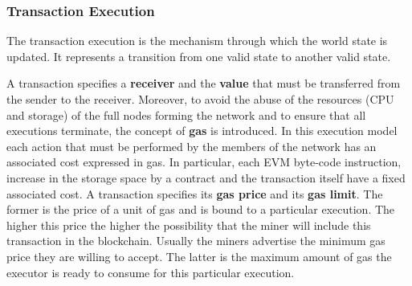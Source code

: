 \subsubsection{Transaction Execution}
\label{sec:tx-execution}

The transaction execution is the mechanism through which the world state is
updated. It represents a transition from one valid state to another valid state.

A transaction specifies a \textbf{receiver} and the \textbf{value} that must be
transferred from the sender to the receiver. Moreover, to avoid the abuse of the
resources (CPU and storage) of the full nodes forming the network and to ensure
that all executions terminate, the concept of \textbf{gas} is introduced. In
this execution model each action that must be performed by the members of the
network has an associated cost expressed in gas. In particular, each EVM
byte-code instruction, increase in the storage space by a contract and the
transaction itself have a fixed associated cost. A transaction specifies its
\textbf{gas price} and its \textbf{gas limit}. The former is the price of a unit
of gas and is bound to a particular execution. The higher this price the higher
the possibility that the miner will include this transaction in the blockchain.
Usually the miners advertise the minimum gas price they are willing to accept.
The latter is the maximum amount of gas the executor is ready to consume for
this particular execution.

